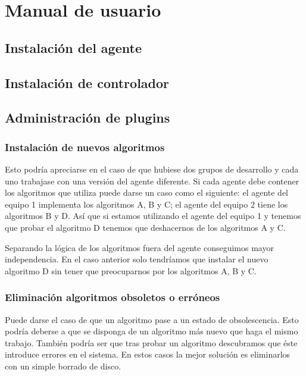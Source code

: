 \chapter{Manual de usuario} 

\section{Instalación del agente}

\section{Instalación de controlador}

\section{Administración de plugins}

\subsection{Instalación de nuevos algoritmos}

Esto podría apreciarse en el caso de que hubiese dos grupos de desarrollo y cada uno trabajase con una versión del agente diferente. Si cada agente debe contener los algoritmos que utiliza puede darse un caso como el siguiente: el agente del equipo 1 implementa los algoritmos A, B y C; el agente del equipo 2 tiene los algoritmos B y D. Así que si estamos utilizando el agente del equipo 1 y tenemos que probar el algoritmo D tenemos que deshacernos de los algoritmos A y C.

Separando la lógica de los algoritmos fuera del agente conseguimos mayor independencia. En el caso anterior solo tendríamos que instalar el nuevo algoritmo D sin tener que preocuparnos por los algoritmos A, B y C.

\subsection{Eliminación algoritmos obsoletos o erróneos}

Puede darse el caso de que un algoritmo pase a un estado de obsolescencia. Esto podría deberse a que se disponga de un algoritmo más nuevo que haga el mismo trabajo. También podría ser que tras probar un algoritmo descubramos que éste introduce errores en el sistema. En estos casos la mejor solución es eliminarlos con un simple borrado de disco.

